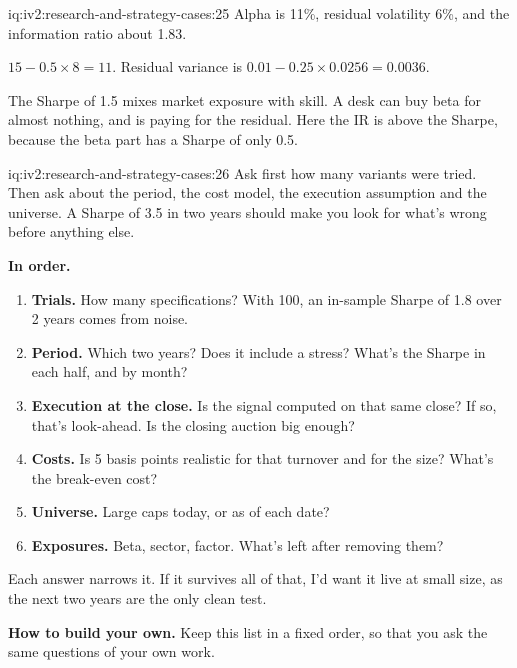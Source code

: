 \begin{solution}{iq:iv2:research-and-strategy-cases:25}
Alpha is 11\%, residual volatility 6\%, and the information ratio about 1.83.

$15 - 0.5 \times 8 = 11$. Residual variance is $0.01 - 0.25 \times 0.0256 = 0.0036$.

The Sharpe of 1.5 mixes market exposure with skill. A desk can buy beta for almost nothing, and is paying for the residual. Here the IR is above the Sharpe, because the beta part has a Sharpe of only 0.5.

\end{solution}

\begin{solution}{iq:iv2:research-and-strategy-cases:26}
Ask first how many variants were tried. Then ask about the period, the cost model, the execution assumption and the universe. A Sharpe of 3.5 in two years should make you look for what's wrong before anything else.

\textbf{In order.}
\begin{enumerate}
\item \textbf{Trials.} How many specifications? With 100, an in-sample Sharpe of 1.8 over 2 years comes from noise.
\item \textbf{Period.} Which two years? Does it include a stress? What's the Sharpe in each half, and by month?
\item \textbf{Execution at the close.} Is the signal computed on that same close? If so, that's look-ahead. Is the closing auction big enough?
\item \textbf{Costs.} Is 5 basis points realistic for that turnover and for the size? What's the break-even cost?
\item \textbf{Universe.} Large caps today, or as of each date?
\item \textbf{Exposures.} Beta, sector, factor. What's left after removing them?
\end{enumerate}

Each answer narrows it. If it survives all of that, I'd want it live at small size, as the next two years are the only clean test.

\textbf{How to build your own.} Keep this list in a fixed order, so that you ask the same questions of your own work.

\end{solution}

